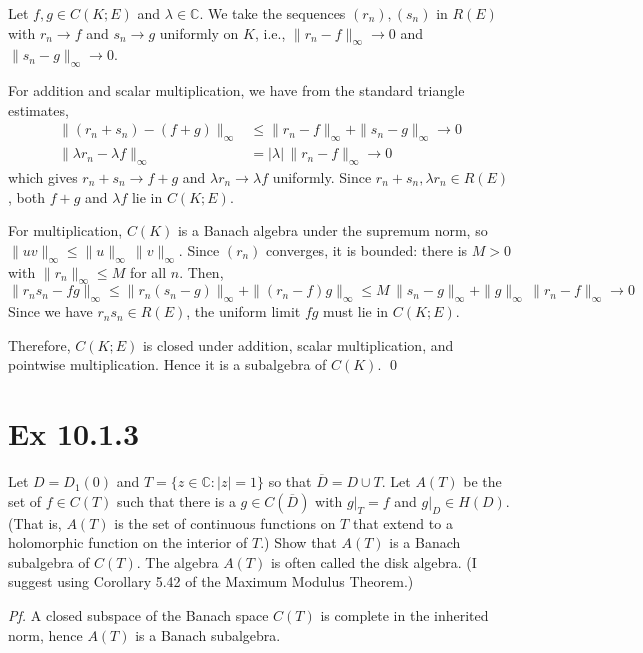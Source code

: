 \documentclass[a4paper]{article}
\begin{document}
\medskip
Let $f, g \in C(K; E)$ and $\lambda \in
\mathbb{C}$. We take the sequences $(r_n), (s_n)$ in $R(E)$ with $r_n \to f$ and $s_n \to g$
uniformly on $K$, i.e., $\|r_n - f\|_\infty \to 0$ and $\|s_n - g\|_\infty \to 0$.

\medskip
For addition and scalar multiplication, we have from the standard triangle estimates,
\begin{align*}
\|(r_n + s_n) - (f + g)\|_\infty &\leq \|r_n - f\|_\infty + \|s_n - g\|_\infty \to 0 \\
\|\lambda r_n - \lambda f\|_\infty &= |\lambda|\,\|r_n - f\|_\infty \to 0
\end{align*}
which gives $r_n + s_n \to f + g$ and $\lambda r_n \to \lambda f$ uniformly. Since $r_n + s_n,
\lambda r_n \in R(E)$, both $f + g$ and $\lambda f$ lie in $C(K; E)$.

\medskip
For multiplication, $C(K)$ is a Banach algebra under the supremum norm, so $\|uv\|_\infty
\leq \|u\|_\infty\,\|v\|_\infty$. Since $(r_n)$ converges, it is bounded: there is $M > 0$
with $\|r_n\|_\infty \leq M$ for all $n$. Then,
\[
\|r_n s_n - f g\|_\infty
\leq \|r_n (s_n - g)\|_\infty + \|(r_n - f) g\|_\infty
\leq M\,\|s_n - g\|_\infty + \|g\|_\infty\,\|r_n - f\|_\infty
\to 0
\]
Since we have $r_n s_n \in R(E)$, the uniform limit $fg$ must lie in $C(K; E)$.

\medskip
Therefore, $C(K; E)$ is closed under addition, scalar multiplication, and pointwise
multiplication. Hence it is a subalgebra of $C(K)$. \qed

\newpage
\section*{Ex 10.1.3}

\begin{tcolorbox}[colback=gray!10, colframe=black, boxrule=0.5pt, arc=2mm]
Let $D = D_1(0)$ and $T = \{z \in \mathbb{C} : |z| = 1\}$ so that $\overline{D} = D \cup T$.
Let $A(T)$ be the set of $f \in C(T)$ such that there is a $g \in C(\overline{D})$ with
$g|_T = f$ and $g|_D \in H(D)$. (That is, $A(T)$ is the set of continuous functions on $T$
that extend to a holomorphic function on the interior of $T$.) Show that $A(T)$ is a Banach
subalgebra of $C(T)$. The algebra $A(T)$ is often called the disk algebra. (I suggest using
Corollary 5.42 of the Maximum Modulus Theorem.)
\end{tcolorbox}

\textit{Pf.} A closed
subspace of the Banach space $C(T)$ is complete in the inherited norm, hence $A(T)$ is a
Banach subalgebra.
\end{document}
